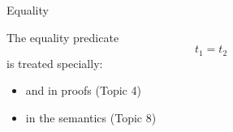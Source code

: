 \documentclass[xetex,aspectratio=169,14pt,hyperref={pdfpagelabels=true,pdflang={en-GB}}]{beamer}
\begin{document}
\begin{frame}
  {Equality}

  The equality predicate
  \begin{displaymath}
    t_1 = t_2
  \end{displaymath}
  is treated specially:
  \begin{itemize}
  \item and in proofs (Topic 4)
  \item in the semantics (Topic 8)
  \end{itemize}
\end{frame}







\end{document}
